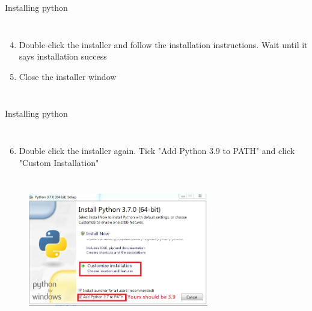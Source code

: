 \documentclass[10pt,xcolor={table,dvipsnames},t]{beamer}
\begin{document}
\begin{frame}{Installing python}
  \begin{columns}
    \begin{enumerate}[Step 1:]
      \setcounter{enumi}{3}
      \item Double-click the installer and follow the installation instructions. Wait until it says installation success
      \item Close the installer window
    \end{enumerate}
  \end{columns}
\end{frame}

\begin{frame}{Installing python}
  \begin{columns}
    \begin{enumerate}[Step 1:]
      \setcounter{enumi}{5}
      \item Double click the installer again. Tick "Add Python 3.9 to PATH" and click "Custom Installation"
    \end{enumerate}
  \end{columns}
  \vspace{1mm}
  \begin{figure}
    \includegraphics[width=0.7\textwidth]{img/install-menu.png}
  \end{figure}
\end{frame}
\end{document}
